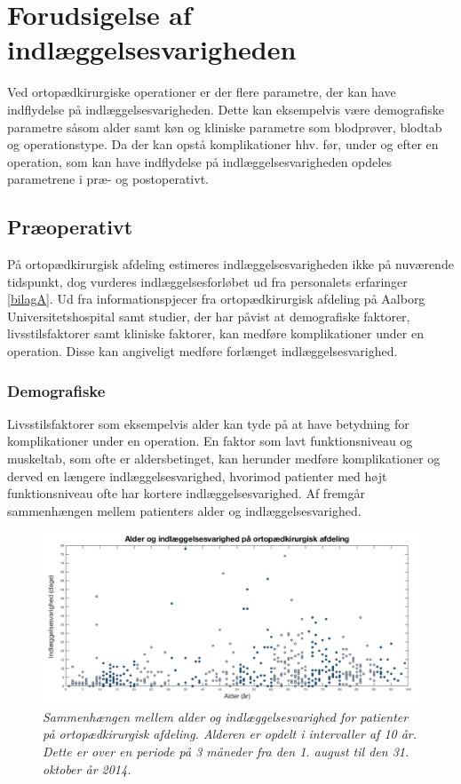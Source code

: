 \section{Forudsigelse af indlæggelsesvarigheden} \label{forudsig}
Ved ortopædkirurgiske operationer er der flere parametre, der kan have indflydelse på indlæggelsesvarigheden. Dette kan eksempelvis være demografiske parametre såsom alder samt køn og kliniske parametre som blodprøver, blodtab og operationstype. Da der kan opstå komplikationer hhv. før, under og efter en operation, som kan have indflydelse på indlæggelsesvarigheden opdeles parametrene i præ- og postoperativt. 


\subsection{Præoperativt} \label{praeop}
På ortopædkirurgisk afdeling estimeres indlæggelsesvarigheden ikke på nuværende tidspunkt, dog vurderes indlæggelsesforløbet ud fra personalets erfaringer \ref{bilagA}. Ud fra informationspjecer fra ortopædkirurgisk afdeling på Aalborg Universitetshospital samt studier, der har påvist at demografiske faktorer, livsstilsfaktorer samt kliniske faktorer, kan medføre komplikationer under en operation\cite{Nordjylland2014}. Disse kan angiveligt medføre forlænget indlæggelsesvarighed.


\subsubsection{Demografiske}
Livsstilsfaktorer som eksempelvis alder kan tyde på at have betydning for komplikationer under en operation. En faktor som lavt funktionsniveau og muskeltab, som ofte er aldersbetinget, kan herunder medføre komplikationer og derved en længere indlæggelsesvarighed, hvorimod patienter med højt funktionsniveau ofte har kortere indlæggelsesvarighed.\cite{Kehlet2001, Janssen2002} Af  fremgår sammenhængen mellem patienters alder og indlæggelsesvarighed. 


\begin{figure}[H]
	\centering
	\includegraphics[scale=0.3]{figures/alderogindlaeg}
	\caption{\textit{Sammenhængen mellem alder og indlæggelsesvarighed for patienter på ortopædkirurgisk afdeling. Alderen er opdelt i intervaller af 10 år. Dette er over en periode på 3 måneder fra den 1. august til den 31. oktober år 2014.}}
	\label{alderogindlaeggelse}
\end{figure}


